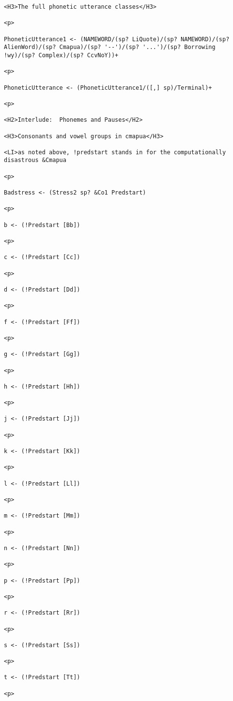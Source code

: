 \documentclass[12pt]{article}
\begin{document}
\begin{lstlisting}
<H3>The full phonetic utterance classes</H3>

<p>

PhoneticUtterance1 <- (NAMEWORD/(sp? LiQuote)/(sp? NAMEWORD)/(sp? AlienWord)/(sp? Cmapua)/(sp? '--')/(sp? '...')/(sp? Borrowing !wy)/(sp? Complex)/(sp? CcvNoY))+

<p>

PhoneticUtterance <- (PhoneticUtterance1/([,] sp)/Terminal)+

<p>

<H2>Interlude:  Phonemes and Pauses</H2>

<H3>Consonants and vowel groups in cmapua</H3>

<LI>as noted above, !predstart stands in for the computationally disastrous &Cmapua

<p>

Badstress <- (Stress2 sp? &Co1 Predstart)

<p>

b <- (!Predstart [Bb])

<p>

c <- (!Predstart [Cc])

<p>

d <- (!Predstart [Dd])

<p>

f <- (!Predstart [Ff])

<p>

g <- (!Predstart [Gg])

<p>

h <- (!Predstart [Hh])

<p>

j <- (!Predstart [Jj])

<p>

k <- (!Predstart [Kk])

<p>

l <- (!Predstart [Ll])

<p>

m <- (!Predstart [Mm])

<p>

n <- (!Predstart [Nn])

<p>

p <- (!Predstart [Pp])

<p>

r <- (!Predstart [Rr])

<p>

s <- (!Predstart [Ss])

<p>

t <- (!Predstart [Tt])

<p>


\end{lstlisting}
\end{document}
